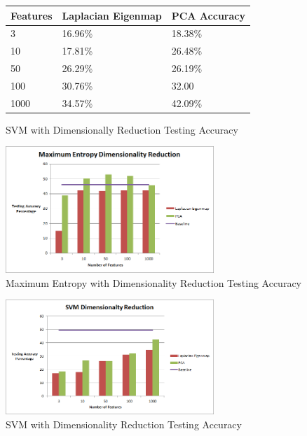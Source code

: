 \begin{figure}[!ht]
\begin{center}
\caption{SVM with Dimensionally Reduction Testing Accuracy}
\begin{tabular}{| l | l | l |}
\hline
Features & Laplacian Eigenmap & PCA Accuracy \\ \hline
3 & 16.96\% & 18.38\% \\ \hline
10 & 17.81\% & 26.48\% \\ \hline
50 & 26.29\% & 26.19\% \\ \hline
100 & 30.76\% & 32.00 \\ \hline
1000 & 34.57\% & 42.09\% \\ \hline
\end{tabular}
\end{center}
\end{figure}

\begin{figure}[!h]
\begin{center}
\caption{Maximum Entropy with Dimensionality Reduction Testing Accuracy}
\includegraphics[width=0.7\textwidth]{Maximum_Entropy_Dimensionality_Reduction.png}
\end{center}
\end{figure}

\begin{figure}[!h]
\begin{center}
\caption{SVM with Dimensionality Reduction Testing Accuracy}
\includegraphics[width=0.7\textwidth]{SVM_Dimensionality_Reduction.png}
\end{center}
\end{figure}


